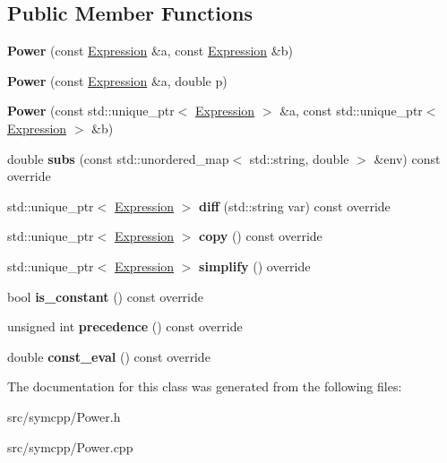 \subsection*{Public Member Functions}
\begin{DoxyCompactItemize}
\item 
{\bfseries Power} (const \hyperlink{classExpression}{Expression} \&a, const \hyperlink{classExpression}{Expression} \&b)\hypertarget{classPower_a20c8bf356b0eb7215b7fef1691f6d8ea}{}\label{classPower_a20c8bf356b0eb7215b7fef1691f6d8ea}

\item 
{\bfseries Power} (const \hyperlink{classExpression}{Expression} \&a, double p)\hypertarget{classPower_ae68614399540a3e2530fdf2cb93a0484}{}\label{classPower_ae68614399540a3e2530fdf2cb93a0484}

\item 
{\bfseries Power} (const std\+::unique\+\_\+ptr$<$ \hyperlink{classExpression}{Expression} $>$ \&a, const std\+::unique\+\_\+ptr$<$ \hyperlink{classExpression}{Expression} $>$ \&b)\hypertarget{classPower_a83f69869b6371b76390bbc465aa073e1}{}\label{classPower_a83f69869b6371b76390bbc465aa073e1}

\item 
double {\bfseries subs} (const std\+::unordered\+\_\+map$<$ std\+::string, double $>$ \&env) const override\hypertarget{classPower_a17275c331531810b50516f0a9432d808}{}\label{classPower_a17275c331531810b50516f0a9432d808}

\item 
std\+::unique\+\_\+ptr$<$ \hyperlink{classExpression}{Expression} $>$ {\bfseries diff} (std\+::string var) const override\hypertarget{classPower_aa90c37729d32e7f30ad743947d4da3c4}{}\label{classPower_aa90c37729d32e7f30ad743947d4da3c4}

\item 
std\+::unique\+\_\+ptr$<$ \hyperlink{classExpression}{Expression} $>$ {\bfseries copy} () const override\hypertarget{classPower_a935b2f34dea51159c2c4a0a4dbe693fe}{}\label{classPower_a935b2f34dea51159c2c4a0a4dbe693fe}

\item 
std\+::unique\+\_\+ptr$<$ \hyperlink{classExpression}{Expression} $>$ {\bfseries simplify} () override\hypertarget{classPower_ad70d28c67f0b95eeecaa41fcc6089992}{}\label{classPower_ad70d28c67f0b95eeecaa41fcc6089992}

\item 
bool {\bfseries is\+\_\+constant} () const override\hypertarget{classPower_a1100129b4570707071f628d45081673f}{}\label{classPower_a1100129b4570707071f628d45081673f}

\item 
unsigned int {\bfseries precedence} () const override\hypertarget{classPower_a32634ccbf14c7a352dd92f7bc8646e30}{}\label{classPower_a32634ccbf14c7a352dd92f7bc8646e30}

\item 
double {\bfseries const\+\_\+eval} () const override\hypertarget{classPower_ad2592aec991a3aed5573b8995adee193}{}\label{classPower_ad2592aec991a3aed5573b8995adee193}

\end{DoxyCompactItemize}


The documentation for this class was generated from the following files\+:\begin{DoxyCompactItemize}
\item 
src/symcpp/Power.\+h\item 
src/symcpp/Power.\+cpp\end{DoxyCompactItemize}
